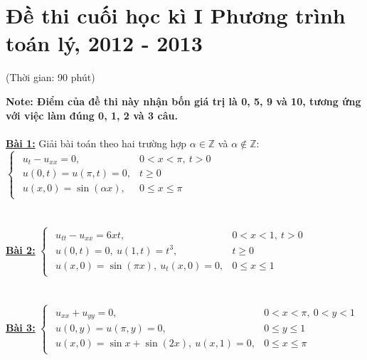 \documentclass[10.5pt, a4paper]{article}
\begin{document}
\section{Đề thi cuối học kì I Phương trình toán lý, 2012 - 2013}
\begin{center}
	\color{blue}(Thời gian: 90 phút)
\end{center}
\textbf{\color{orange}Note: Điểm của đề thi này nhận bốn giá trị là 0, 5, 9 và 10, tương ứng với việc làm đúng 0, 1, 2 và 3 câu.}\\\\
\color{red}\underline{\textbf{Bài 1:}} \color{black}Giải bài toán theo hai trường hợp $\alpha\in\mathbb Z$ và $\alpha\notin\mathbb Z$: $\begin{cases}
\begin{array}{ll}
u_t-u_{xx}=0, & 0<x<\pi,~t>0\\
u(0,t)=u(\pi,t)=0, & t\ge0\\
u(x,0)=\sin(\alpha x), & 0\le x\le\pi
\end{array}
\end{cases}$\\\\\\
\color{red}\underline{\textbf{Bài 2:}} \color{black}$\begin{cases}
\begin{array}{ll}
u_{tt}-u_{xx}=6xt, & 0<x<1,~t>0\\
u(0,t)=0,~u(1,t)=t^3, & t\ge0\\
u(x,0)=\sin(\pi x),~u_t(x,0)=0, & 0\le x\le1
\end{array}
\end{cases}$\\\\\\
\color{red}\underline{\textbf{Bài 3:}} \color{black}$\begin{cases}
\begin{array}{ll}
u_{xx}+u_{yy}=0, & 0<x<\pi,~0<y<1\\
u(0,y)=u(\pi,y)=0, & 0\le y\le1\\
u(x,0)=\sin x+\sin(2x),~u(x,1)=0, & 0\le x\le\pi
\end{array}
\end{cases}$

\newpage
\end{document}
